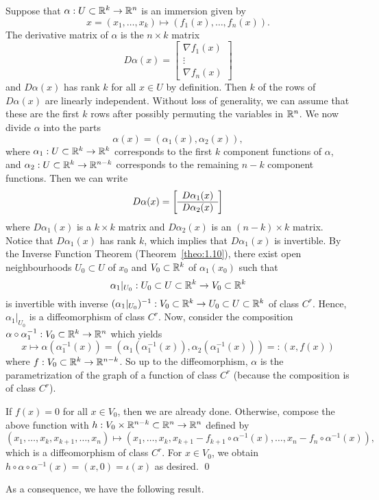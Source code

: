 \begin{pf}
    Suppose that $\alpha : U \subset \mathbb{R}^k \to \mathbb{R}^n$ is an immersion given by 
    \[ x = (x_1, \dots, x_k) \mapsto (f_1(x), \dots, f_n(x)). \] 
    The derivative matrix of $\alpha$ is the $n \times k$ matrix 
    \[ D\alpha(x) = \begin{bmatrix}
        \nabla f_1(x) \\ \vdots \\ \nabla f_n(x) 
    \end{bmatrix} \] 
    and $D\alpha(x)$ has rank $k$ for all $x \in U$ by definition. Then 
    $k$ of the rows of $D\alpha(x)$ are linearly independent. Without loss of 
    generality, we can assume that these are the first $k$ rows after possibly 
    permuting the variables in $\mathbb{R}^n$. We now divide $\alpha$ into 
    the parts 
    \[ \alpha(x) = (\alpha_1(x), \alpha_2(x)), \] 
    where $\alpha_1 : U \subset \mathbb{R}^k \to \mathbb{R}^k$ corresponds to the first 
    $k$ component functions of $\alpha$, and $\alpha_2 : U \subset \mathbb{R}^k \to \mathbb{R}^{n-k}$ 
    corresponds to the remaining $n-k$ component functions. Then we can write 
    \[ D\alpha(x) = \mleft[ \begin{array}{c} D\alpha_1(x) \\ \hline D\alpha_2(x) \end{array} \mright] \]
    where $D\alpha_1(x)$ is a $k \times k$ matrix and $D\alpha_2(x)$ is an 
    $(n-k) \times k$ matrix. Notice that $D\alpha_1(x)$ has rank $k$, which 
    implies that $D\alpha_1(x)$ is invertible. By the Inverse Function Theorem 
    (Theorem~\ref{theo:1.10}), there exist open neighbourhoods $U_0 \subset U$ 
    of $x_0$ and $V_0 \subset \mathbb{R}^k$ of $\alpha_1(x_0)$ such that 
    \[ \alpha_1|_{U_0} : U_0 \subset U \subset \mathbb{R}^k \to V_0 \subset \mathbb{R}^k \] 
    is invertible with inverse 
    $(\alpha_1|_{U_0})^{-1} : V_0 \subset \mathbb{R}^k \to U_0 \subset U \subset \mathbb{R}^k$ 
    of class $C^r$. Hence, $\alpha_1|_{U_0}$ is a diffeomorphism of class $C^r$. 
    Now, consider the composition $\alpha \circ \alpha_1^{-1} : 
    V_0 \subset \mathbb{R}^k \to \mathbb{R}^n$ which yields 
    \[ x \mapsto \alpha(\alpha_1^{-1}(x)) = (\alpha_1(\alpha_1^{-1}(x)), 
    \alpha_2(\alpha_1^{-1}(x))) =: (x, f(x)) \]  
    where $f : V_0 \subset \mathbb{R}^k \to \mathbb{R}^{n-k}$. So up to the diffeomorphism, 
    $\alpha$ is the parametrization of the graph of a function of class $C^r$ 
    (because the composition is of class $C^r$). 

    If $f(x) = 0$ for all $x \in V_0$, then we are already done. Otherwise, 
    compose the above function with $h : V_0 \times \mathbb{R}^{n-k} \subset \mathbb{R}^n 
    \to \mathbb{R}^n$ defined by 
    \[ (x_1, \dots, x_k, x_{k+1}, \dots, x_n) \mapsto 
    (x_1, \dots, x_k, x_{k+1} - f_{k+1} \circ \alpha^{-1}(x), \dots, 
    x_n - f_n \circ \alpha^{-1}(x)), \] 
    which is a diffeomorphism of class $C^r$. For $x \in V_0$, we obtain 
    $h \circ \alpha \circ \alpha^{-1}(x) = (x, 0) = \iota(x)$ as desired. \qed 
\end{pf}\vspace{-0.25cm}
As a consequence, we have the following result. 

